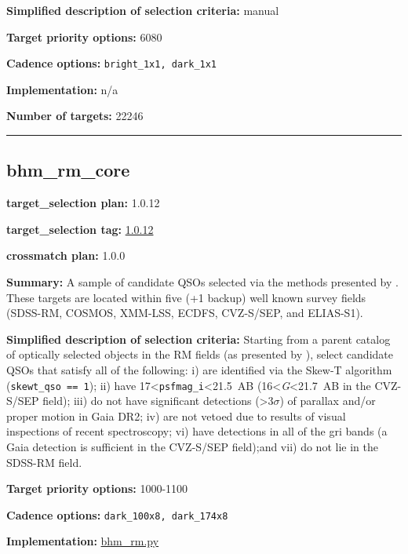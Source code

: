 \noindent\textbf{Simplified description of selection criteria:} manual


\noindent\textbf{Target priority options:} 6080

\noindent\textbf{Cadence options:} \texttt{bright\_1x1,\ dark\_1x1}

\noindent\textbf{Implementation:} n/a

\noindent\textbf{Number of targets:} 22246

\begin{center}\rule{0.5\linewidth}{0.5pt}\end{center}

\hypertarget{bhm_rm_core_plan1.0.12}{%
\subsection{bhm\_rm\_core}\label{bhm_rm_core_plan1.0.12}}

\noindent\textbf{target\_selection plan:} 1.0.12

\noindent\textbf{target\_selection tag:}
\href{https://github.com/sdss/target_selection/tree/1.0.12/}{1.0.12}

\noindent\textbf{crossmatch plan:} 1.0.0

\noindent\textbf{Summary:} A sample of candidate QSOs selected via the methods
presented by
\citet{Yang2022}. These targets are located within five (+1 backup) well
known survey fields (SDSS-RM, COSMOS, XMM-LSS, ECDFS, CVZ-S/SEP, and
ELIAS-S1).

\noindent\textbf{Simplified description of selection criteria:} Starting from a
parent catalog of optically selected objects in the RM fields (as
presented by
\citealt{Yang2022}), select candidate QSOs that satisfy all of the
following: i) are identified via the Skew-T algorithm
(\texttt{skewt\_qso\ ==\ 1}); ii) have
17\textless{}\texttt{psfmag\_i}\textless21.5~AB
(16\textless{}\emph{G}\textless21.7~AB in the CVZ-S/SEP field); iii) do
not have significant detections (\textgreater3$\sigma$) of parallax and/or
proper motion in Gaia DR2; iv) are not vetoed due to results of visual
inspections of recent spectroscopy; vi) have detections in all of the
gri bands (a Gaia detection is sufficient in the CVZ-S/SEP field);and
vii) do not lie in the SDSS-RM field.


\noindent\textbf{Target priority options:} 1000-1100

\noindent\textbf{Cadence options:} \texttt{dark\_100x8,\ dark\_174x8}

\noindent\textbf{Implementation:}
\href{https://github.com/sdss/target_selection/blob/1.0.12/python/target_selection/cartons/bhm_rm.py}{bhm\_rm.py}

